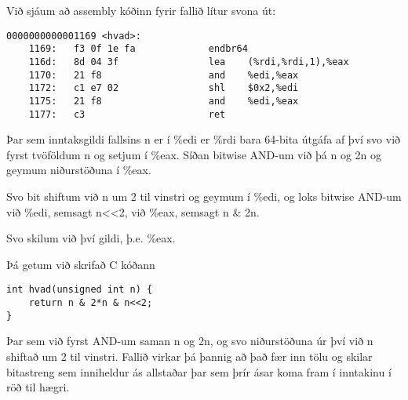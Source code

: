 \documentclass{article}
\begin{document}
		Við sjáum að assembly kóðinn fyrir fallið lítur svona út:
		\begin{verbatim}
0000000000001169 <hvad>:
    1169:	f3 0f 1e fa          	endbr64
    116d:	8d 04 3f             	lea    (%rdi,%rdi,1),%eax
    1170:	21 f8                	and    %edi,%eax
    1172:	c1 e7 02             	shl    $0x2,%edi
    1175:	21 f8                	and    %edi,%eax
    1177:	c3                   	ret
		\end{verbatim}
		
		Þar sem inntaksgildi fallsins n er í \%edi er \%rdi bara 64-bita 
		útgáfa af því svo við fyrst tvöföldum n og setjum í \%eax. Síðan 
		bitwise AND-um við þá n og 2n og geymum niðurstöðuna í \%eax.

		Svo bit shiftum við n um 2 til vinstri og geymum í \%edi, og loks 
		bitwise AND-um við \%edi, semsagt n<<2, við \%eax, semsagt n \& 2n.

		Svo skilum við því gildi, þ.e. \%eax.

		Þá getum við skrifað C kóðann

		\begin{verbatim}
int hvad(unsigned int n) {
    return n & 2*n & n<<2;
}
		\end{verbatim}

		Þar sem við fyrst AND-um saman n og 2n, og svo niðurstöðuna úr því 
		við n shiftað um 2 til vinstri. Fallið virkar þá þannig að það fær 
		inn tölu og skilar bitastreng sem inniheldur ás allstaðar þar sem 
		þrír ásar koma fram í inntakinu í röð til hægri.
\end{document}
